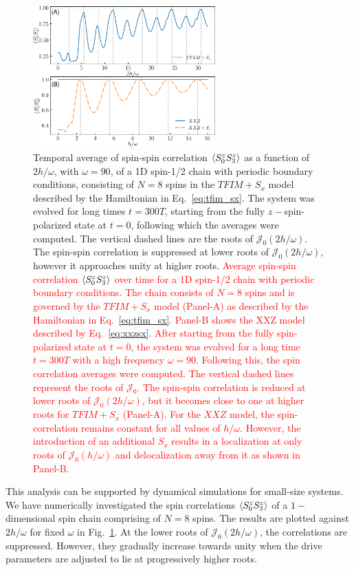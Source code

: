 \documentclass[%
reprint,
superscriptaddress,
amsmath,amssymb,
aps,
prb,
showkeys,
]{revtex4-2}
\newcommand{\red}[1]{\textcolor{red}{#1}}
\begin{document}
	\begin{figure}[t!]
		\centering
		\includegraphics[width = 7.0cm]{corrN8sz0sz3avg_tfim_sx_xxz_sx.pdf}
		\caption{Temporal average of spin-spin correlation $\expval{S^z_0 S^z_3}$ as a function of $2h/\omega$, with $\omega=90$, of a 1D spin-1/2 chain with periodic boundary conditions, consisting of $N=8$ spins in the $TFIM+S_x$ model described by the Hamiltonian in Eq.~\ref{eq:tfim_sx}. The system was evolved for long times $t=300T$, starting from the fully $z-$spin-polarized state at $t=0$,  following which the averages were computed.  The  vertical dashed lines are the roots of $\mathcal{J}_0\left(2h/\omega\right)$. The spin-spin correlation is suppressed at lower roots  of $\mathcal{J}_0\left(2h/\omega\right)$, however it approaches unity at higher roots. \red{Average spin-spin correlation $\expval{S^z_0 S^z_3}$ over time for a 1D spin-1/2 chain with periodic boundary conditions. The chain consists of $N=8$ spins and is governed by the $TFIM+S_x$ model (Panel-A) as described by the Hamiltonian in Eq.~\ref{eq:tfim_sx}. Panel-B shows the XXZ model described by Eq.~\eqref{eq:xxzsx}. After starting from the fully spin-polarized state at $t=0$, the system was evolved for a long time $t=300T$ with a high frequency $\omega=90$. Following this, the spin correlation averages were computed.  The vertical dashed lines represent the roots of $\mathcal{J}_0$. The spin-spin correlation is reduced at lower roots of $\mathcal{J}_0\left(2h/\omega\right)$, but it becomes close to one at higher roots for $TFIM+S_x$ (Panel-A). For the $XXZ$ model, the spin-correlation remains constant for all values of $h/\omega$. However, the introduction of an additional $S_x$ results in a localization at only roots of $\mathcal{J}_0\left(h/\omega\right)$ and delocalization away from it as shown in Panel-B.}
		}
		\label{fig:ipr:tfimsx}
	\end{figure}
	This analysis can be supported by dynamical simulations for small-size systems. We have numerically investigated the spin correlations $\expval{S^z_0 S^z_3}$ of a $1-$dimensional spin chain comprising of $N=8$ spins. The results are plotted against $2h/\omega$ for fixed $\omega$ in Fig.~\ref{fig:ipr:tfimsx}. At the lower roots of $\mathcal{J}_0\left(2h/\omega\right)$,  the correlations are suppressed. However,  they  gradually increase towards unity when the drive parameters are adjusted to lie at progressively higher roots.
	
\end{document}
